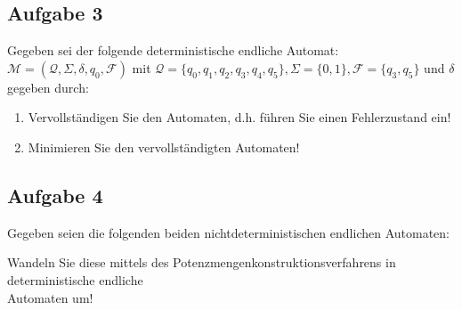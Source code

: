 \documentclass[10pt,oneside,onecolumn,a4paper,german,titlepage]{article}
\begin{document}
\subsection*{Aufgabe 3}
Gegeben sei der folgende deterministische endliche Automat:\\
$\mathcal{M} = (\mathcal{Q},\Sigma,\delta,q_0,\mathcal{F})$ mit
$\mathcal{Q} = \{q_0,q_1,q_2,q_3,q_4,q_5\}, \Sigma = \{0,1\}, \mathcal{F} =
\{q_3,q_5\}$ und $\delta$ gegeben durch:
\begin{center}
\end{center}
\begin{enumerate}
\item Vervollständigen Sie den Automaten, d.h. führen Sie einen Fehlerzustand ein!
\item Minimieren Sie den vervollständigten Automaten!
\end{enumerate}

\newpage

\subsection*{Aufgabe 4}
Gegeben seien die folgenden beiden nichtdeterministischen endlichen Automaten:
\begin{center}
\end{center}
Wandeln Sie diese mittels des Potenzmengenkonstruktionsverfahrens in
deterministische endliche\\
Automaten um!

\newpage
\end{document}
